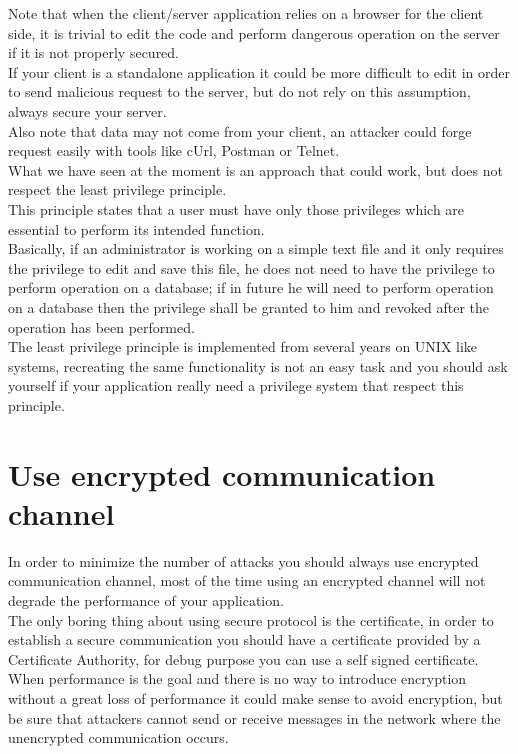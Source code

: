Note that when the client/server application relies on a browser for the client side, it is trivial to edit the code and perform dangerous operation on the server if it is not properly secured.\\
If your client is a standalone application it could be more difficult to edit in order to send malicious request to the server, but do not rely on this assumption, always secure your server.\\
Also note that data may not come from your client, an attacker could forge request easily with tools like cUrl, Postman or Telnet.\\
What we have seen at the moment is an approach that could work, but does not respect the least privilege principle.\\
This principle states that a user must have only those privileges which are essential to perform its intended function.\\
Basically, if an administrator is working on a simple text file and it only requires the privilege to edit and save this file, he does not need to have the privilege to perform operation on a database; if in future he will need to perform operation on a database then the privilege shall be granted to him and revoked after the operation has been performed.\\
The least privilege principle is implemented from several years on UNIX like systems, recreating the same functionality is not an easy task and you should ask yourself if your application really need a privilege system that respect this principle.

\section{Use encrypted communication channel}
In order to minimize the number of attacks you should always use encrypted communication channel, most of the time
using an encrypted channel will not degrade the performance of your application.\\
The only boring thing about using secure protocol is the certificate, in order to establish a secure communication you should have
a certificate provided by a Certificate Authority, for debug purpose you can use a self signed certificate.\\

When performance is the goal and there is no way to introduce encryption without a great loss of performance it could make sense
to avoid encryption, but be sure that attackers cannot send or receive messages in the network where the unencrypted communication occurs.\\

